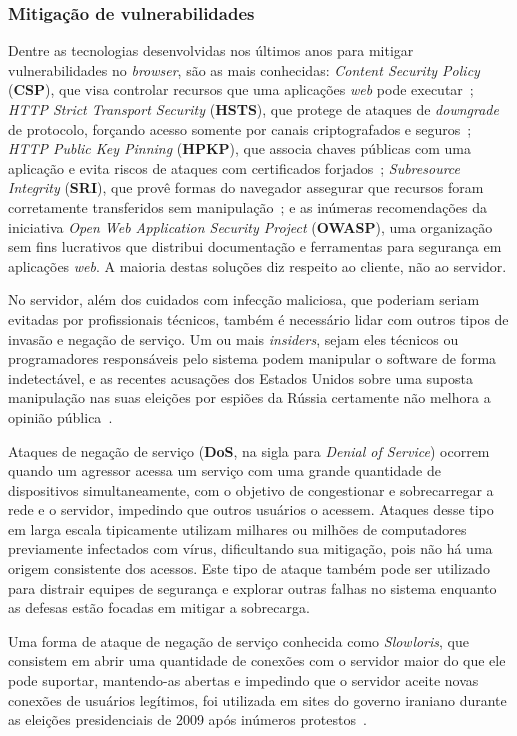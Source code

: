 \subsubsection{Mitigação de vulnerabilidades}

Dentre as tecnologias desenvolvidas nos últimos anos para mitigar
vulnerabilidades no \textit{browser}, são as mais conhecidas:
\textit{Content Security Policy} (\textbf{CSP}), que visa controlar recursos
que uma aplicações \textit{web} pode executar~\cite{west2016csp};
\textit{HTTP Strict Transport Security} (\textbf{HSTS}), que protege de ataques
de \textit{downgrade} de protocolo, forçando acesso somente por canais
criptografados e seguros~\cite{rfc6797}; \textit{HTTP Public Key Pinning}
(\textbf{HPKP}), que associa chaves públicas com uma aplicação e evita riscos
de ataques com certificados forjados~\cite{rfc7469};
\textit{Subresource Integrity} (\textbf{SRI}), que provê formas do navegador
assegurar que recursos foram corretamente transferidos sem
manipulação~\cite{akhawe2016sri}; e as inúmeras recomendações da iniciativa
\textit{Open Web Application Security Project} (\textbf{OWASP}), uma
organização sem fins lucrativos que distribui documentação e ferramentas para
segurança em aplicações \textit{web}. A maioria destas soluções diz respeito ao
cliente, não ao servidor.

No servidor, além dos cuidados com infecção maliciosa, que poderiam seriam
evitadas por profissionais técnicos, também é necessário lidar com outros tipos
de invasão e negação de serviço. Um ou mais \textit{insiders}, sejam eles
técnicos ou programadores responsáveis pelo sistema podem manipular o software
de forma indetectável, e as recentes acusações dos Estados Unidos sobre uma
suposta manipulação nas suas eleições por espiões da Rússia certamente não
melhora a opinião pública~\cite{badawy2018analyzing}.

Ataques de negação de serviço (\textbf{DoS}, na sigla para
\textit{Denial of Service}) ocorrem quando um agressor acessa um serviço com
uma grande quantidade de dispositivos simultaneamente, com o objetivo de
congestionar e sobrecarregar a rede e o servidor, impedindo que outros usuários
o acessem.  Ataques desse tipo em larga escala tipicamente utilizam milhares ou
milhões de computadores previamente infectados com vírus, dificultando sua
mitigação, pois não há uma origem consistente dos acessos. Este tipo de ataque
também pode ser utilizado para distrair equipes de segurança e explorar outras
falhas no sistema enquanto as defesas estão focadas em mitigar a sobrecarga.

Uma forma de ataque de negação de serviço conhecida como \textit{Slowloris},
que consistem em abrir uma quantidade de conexões com o servidor maior do que
ele pode suportar, mantendo-as abertas e impedindo que o servidor aceite novas
conexões de usuários legítimos, foi utilizada em sites do governo iraniano
durante as eleições presidenciais de 2009 após inúmeros
protestos~\cite{zdrnja2009slowloris}.


